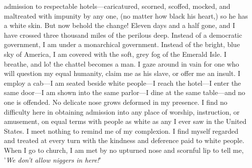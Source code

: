 admission to respectable hotels---caricatured, scorned, {}scoffed,
mocked, and maltreated with impunity by any one, (no matter how black
his heart,) so he has a white skin. But now behold the change! Eleven
days and a half gone, and I have crossed three thousand miles of the
perilous deep. Instead of a democratic government, I am under a
monarchical government. Instead of the bright, blue sky of America, I am
covered with the soft, grey fog of the Emerald Isle. I breathe, and lo!
the chattel becomes a man. I gaze around in vain for one who will
question my equal humanity, claim me as his slave, or offer me an
insult. I employ a cab---I am seated beside white people---I reach the
hotel---I enter the same door---I am shown into the same parlor---I dine
at the same table---and no one is offended. No delicate nose grows
deformed in my presence. I find no difficulty here in obtaining
admission into any place of worship, instruction, or amusement, on equal
terms with people as white as any I ever saw in the United States. I
meet nothing to remind me of my complexion. I find myself regarded and
treated at every turn with the kindness and deference paid to white
people. When I go to church, I am met by no upturned nose and scornful
lip to tell me, {'}\emph{We don't allow niggers in here!}{'}

